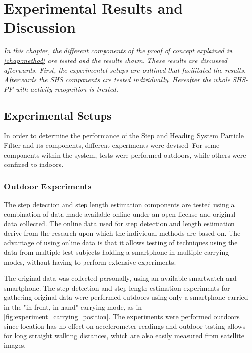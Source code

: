 \chapter{Experimental Results and Discussion}

\textit{In this chapter, the  different components of the proof of concept explained in \cref{chap:method} are tested and the results shown. These results are discussed afterwards. First, the  experimental setups are outlined that facilitated the results. Afterwards the \ac{SHS} components are tested individually. Hereafter the whole SHS-PF with activity recognition is treated.}

\section{Experimental Setups}
\label{sec:results-experimental setup}
In order to determine the performance of the Step and Heading System Particle Filter and its components, different experiments were devised. For some components within the system, tests were performed outdoors, while others were confined to indoors. \par 

\subsection{Outdoor Experiments}
The step detection and step length estimation components are tested using a combination of data made available online under an open license and original data collected. The online data used for step detection and length estimation derive from the research upon which the individual methods are based on. The advantage of using online data is that it allows testing of techniques using the data from multiple test subjects holding a smartphone in multiple carrying modes, without having to perform extensive experiments.  \par 

The original data was collected personally, using an available smartwatch and smartphone. The step detection and step length estimation experiments for gathering original data  were performed outdoors using only a smartphone carried in the "in front, in hand" carrying mode, as in \cref{fig:experiment_carrying_position}. The experiments were performed outdoors since location has no effect on accelerometer readings and outdoor testing allows for long straight walking distances, which are also easily measured from satellite images.\par 

